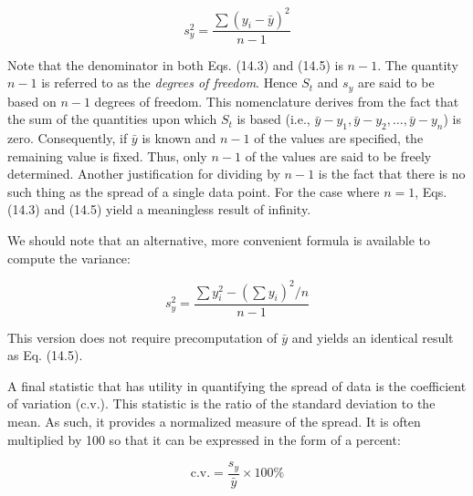 \documentclass[../main.tex]{subfiles}
\begin{document}
\begin{equation}
	\tag{14.5}
	s^2_y = \frac{\sum (y_i - \bar{y})^2}{n-1}
\end{equation}

Note that the denominator in both Eqs. (14.3) and (14.5) is $n - 1$. The quantity $n - 1$
is referred to as the \textit{degrees of freedom}. Hence $S_t$ and $s_y$ are said to be based on $n - 1$ degrees of freedom. This nomenclature derives from the fact that the sum of the quantities
upon which $S_t$ is based (i.e., $\bar{y} - y_1 , \bar{y} - y_2 , \dots , \bar{y} - y_n$) is zero. Consequently, if $\bar{y}$ is
known and $n - 1$ of the values are specified, the remaining value is fixed. Thus, only $n - 1$
of the values are said to be freely determined. Another justification for dividing by $n - 1$ is
the fact that there is no such thing as the spread of a single data point. For the case where
$n = 1$, Eqs. (14.3) and (14.5) yield a meaningless result of infinity.

We should note that an alternative, more convenient formula is available to compute
the variance:

\begin{equation}
	\tag{14.6}
	s^2_y = \frac{\sum y_i^2 -(\sum y_i)^2 / n}{n-1}
\end{equation}

\noindent This version does not require precomputation of $\bar{y}$ and yields an identical result as Eq. (14.5).

A final statistic that has utility in quantifying the spread of data is the coefficient of
variation (c.v.). This statistic is the ratio of the standard deviation to the mean. As such, it
provides a normalized measure of the spread. It is often multiplied by 100 so that it can be
expressed in the form of a percent:

\begin{equation}
	\tag{14.7}
	\text{c.v.} = \frac{s_y}{\bar{y}} \times 100\%
\end{equation}
\end{document}
